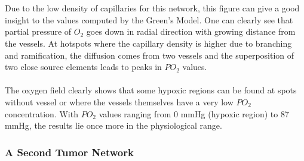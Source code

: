 \\
\\Due to the low density of capillaries for this network, this figure can give a good insight to the values computed by the Green's Model. One can clearly see that partial pressure of $O_2$ goes down in radial direction with growing distance from the vessels. At hotspots where the capillary density is higher due to branching and ramification, the diffusion comes from two vessels and the superposition of two close source elements leads to peaks in $PO_2$ values.\\
\\The oxygen field clearly shows that some hypoxic regions can be found at spots without vessel or where the vessels themselves have a very low $PO_2$ concentration. With $PO_2$ values ranging from $0$ mmHg (hypoxic region) to 87 mmHg, the results lie once more in the physiological range.

\newpage
\subsubsection*{A Second Tumor Network}

